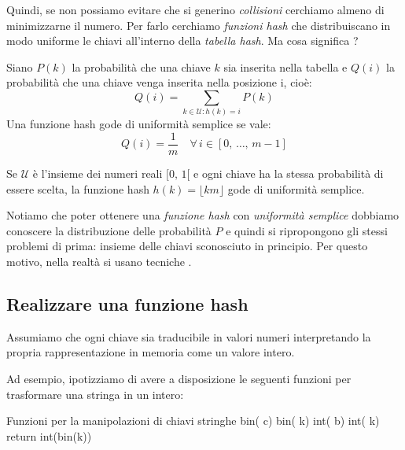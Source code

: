 Quindi, se non possiamo evitare che si generino \emph{collisioni} cerchiamo almeno
di minimizzarne il numero. Per farlo cerchiamo \emph{funzioni hash} che
distribuiscano in modo uniforme le chiavi all'interno della \emph{tabella hash}.
Ma cosa significa ?
\begin{definition}
    Siano $P(k)$ la probabilità che una chiave $k$ sia inserita nella tabella e
    $Q(i)$ la probabilità che una chiave venga inserita nella posizione i, cioè:
    \[Q(i)=\sum_{k\in\mathcal{U}:h(k)=i}P(k)\]
    Una funzione hash gode di uniformità semplice se vale:
    \[Q(i)=\frac{1}{m}\quad\forall\,i\in[0,\,\dots,\,m-1]\]
\end{definition}
\begin{eg}
    Se $\mathcal{U}$ è l'insieme dei numeri reali $[0,\,1[$ e ogni chiave ha la
    stessa probabilità di essere scelta, la funzione hash $h(k)=\lfloor km\rfloor$
    gode di uniformità semplice.
\end{eg}\noindent
Notiamo che poter ottenere una \emph{funzione hash} con \emph{uniformità semplice}
dobbiamo conoscere la distribuzione delle probabilità $P$ e quindi si ripropongono
gli stessi problemi di prima: insieme delle chiavi sconosciuto in principio.
Per questo motivo, nella realtà si usano tecniche .

\subsection{Realizzare una funzione hash}
Assumiamo che ogni chiave sia traducibile in valori numeri interpretando la
propria rappresentazione in memoria come un valore intero.

Ad esempio, ipotizziamo di avere a disposizione le seguenti funzioni per
trasformare una stringa in un intero:
\begin{code}{Funzioni per la manipolazioni di chiavi stringhe}
 bin( c)
\nl{}
 bin( k)
\nl{}
 int( b)
\nl{}
\rmbreak\ind{} int( k)\\
    return int(bin(k))
\end{code}

